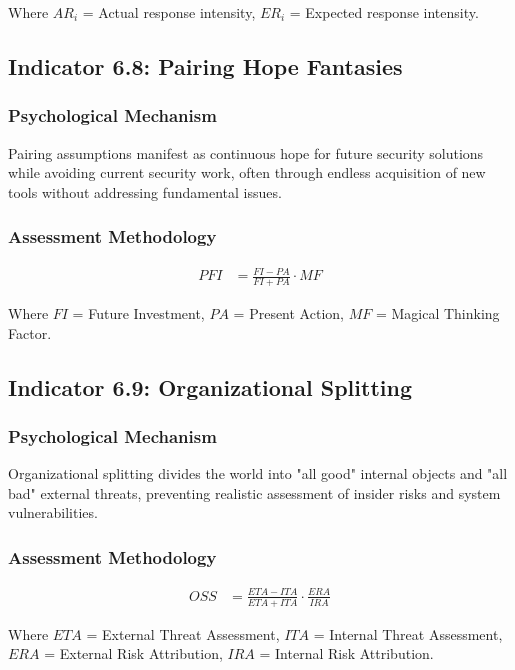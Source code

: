 \documentclass[11pt,a4paper]{article}
\begin{document}
Where $AR_i$ = Actual response intensity, $ER_i$ = Expected response intensity.

\subsection{Indicator 6.8: Pairing Hope Fantasies}

\subsubsection{Psychological Mechanism}

Pairing assumptions manifest as continuous hope for future security solutions while avoiding current security work, often through endless acquisition of new tools without addressing fundamental issues.

\subsubsection{Assessment Methodology}

\begin{align}
PFI &= \frac{FI - PA}{FI + PA} \cdot MF
\end{align}

Where $FI$ = Future Investment, $PA$ = Present Action, $MF$ = Magical Thinking Factor.

\subsection{Indicator 6.9: Organizational Splitting}

\subsubsection{Psychological Mechanism}

Organizational splitting divides the world into "all good" internal objects and "all bad" external threats, preventing realistic assessment of insider risks and system vulnerabilities.

\subsubsection{Assessment Methodology}

\begin{align}
OSS &= \frac{ETA - ITA}{ETA + ITA} \cdot \frac{ERA}{IRA}
\end{align}

Where $ETA$ = External Threat Assessment, $ITA$ = Internal Threat Assessment, $ERA$ = External Risk Attribution, $IRA$ = Internal Risk Attribution.
\end{document}
